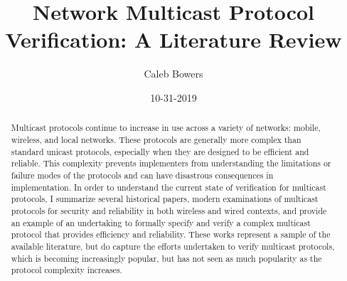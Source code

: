 \documentclass[12pt, fullpage]{article}
\title{Network Multicast Protocol Verification: A Literature Review}
\author{Caleb Bowers}
\date{10-31-2019}
\begin{document}
\begin{titlingpage}
\maketitle
\begin{abstract}
Multicast protocols continue to increase in use across a variety of networks: mobile, wireless, and local networks. These protocols are generally more complex than standard unicast protocols, especially when they are designed to be efficient and reliable. This complexity prevents implementers from understanding the limitations or failure modes of the protocols and can have disastrous consequences in implementation. In order to understand the current state of verification for multicast protocols, I summarize several historical papers, modern examinations of multicast protocols for security and reliability in both wireless and wired contexts, and provide an example of an undertaking to formally specify and verify a complex multicast protocol that provides efficiency and reliability. These works represent a sample of the available literature, but do capture the efforts undertaken to verify multicast protocols, which is becoming increasingly popular, but has not seen as much popularity as the protocol complexity increases.
\end{abstract}
\end{titlingpage}

\tableofcontents
\end{document}
